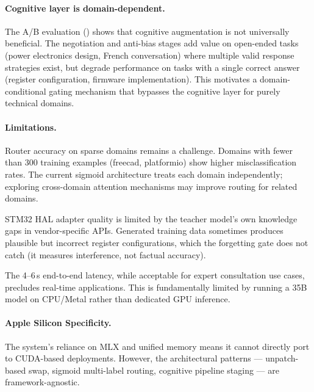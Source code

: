 \documentclass[11pt,a4paper]{article}
\begin{document}
\paragraph{Cognitive layer is domain-dependent.}
The A/B evaluation () shows that cognitive augmentation is not universally beneficial. The negotiation and anti-bias stages add value on open-ended tasks (power electronics design, French conversation) where multiple valid response strategies exist, but degrade performance on tasks with a single correct answer (register configuration, firmware implementation). This motivates a domain-conditional gating mechanism that bypasses the cognitive layer for purely technical domains.

\paragraph{Limitations.}

Router accuracy on sparse domains remains a challenge. Domains with fewer than 300 training examples (freecad, platformio) show higher misclassification rates. The current sigmoid architecture treats each domain independently; exploring cross-domain attention mechanisms may improve routing for related domains.

STM32 HAL adapter quality is limited by the teacher model's own knowledge gaps in vendor-specific APIs. Generated training data sometimes produces plausible but incorrect register configurations, which the forgetting gate does not catch (it measures interference, not factual accuracy).

The 4--6\,s end-to-end latency, while acceptable for expert consultation use cases, precludes real-time applications. This is fundamentally limited by running a 35B model on CPU/Metal rather than dedicated GPU inference.

\paragraph{Apple Silicon Specificity.}
The system's reliance on MLX and unified memory means it cannot directly port to CUDA-based deployments. However, the architectural patterns --- unpatch-based swap, sigmoid multi-label routing, cognitive pipeline staging --- are framework-agnostic.
\end{document}
